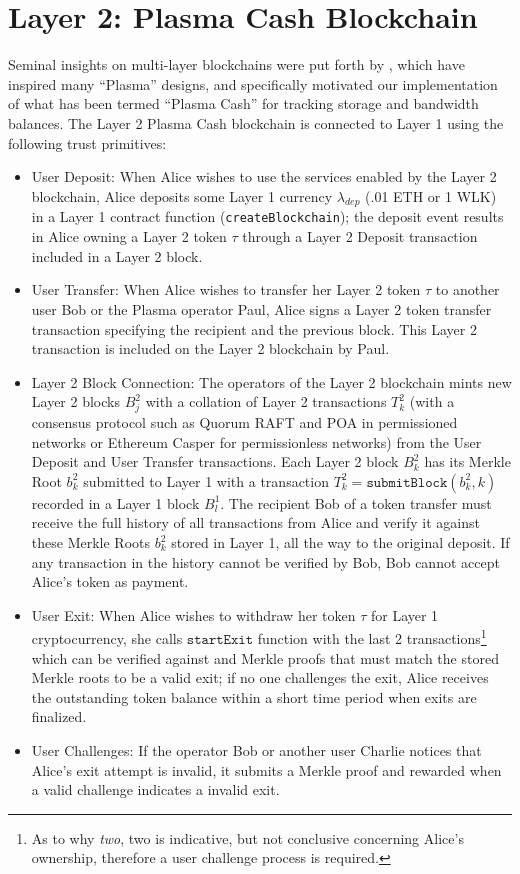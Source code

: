 \documentclass{article}
\newcommand{\block}[2]{B^{#1}_{#2}}
\newcommand{\blockhash}[2]{b^{#1}_{#2}}
\newcommand{\transaction}[2]{T_{#2}^#1}
\newcommand{\submitblock}[2]{\texttt{submitBlock}(#2, #1)}
\newcommand{\startexit}{\texttt{startExit}}
\begin{document}
\section{Layer 2: Plasma Cash Blockchain}

Seminal insights on multi-layer blockchains were put forth by \cite{poonbuterin2017}, which have inspired many ``Plasma'' designs, and specifically motivated our implementation of what has been termed ``Plasma Cash'' for tracking storage and  bandwidth balances.  The Layer 2 Plasma Cash blockchain is connected to Layer 1 using the following trust primitives:
\begin{itemize}
\item User Deposit: When Alice wishes to use the services enabled by the Layer 2 blockchain, Alice deposits some Layer 1 currency $\lambda_{dep}$ (.01 ETH or 1 WLK) in a Layer 1 contract function (\texttt{createBlockchain}); the deposit event results in Alice owning a Layer 2 token $\tau$ through a Layer 2 Deposit transaction included in a Layer 2 block.

\item User Transfer: When Alice wishes to transfer her Layer 2 token $\tau$ to another user Bob or the Plasma operator Paul, Alice signs a Layer 2 token transfer transaction specifying the recipient and the previous block.  This Layer 2 transaction is included on the Layer 2 blockchain by Paul.   

\item Layer 2 Block Connection: The operators of the Layer 2 blockchain mints new Layer 2 blocks $\block{2}{j}$ with a collation of Layer 2 transactions $\transaction{2}{k}$ (with a consensus protocol such as Quorum RAFT and POA in permissioned networks or Ethereum Casper for permissionless networks) from the User Deposit and User Transfer transactions.  Each Layer 2 block $\block{2}{k}$ has its Merkle Root $\blockhash{2}{k}$ submitted to Layer 1 with a transaction $\transaction{2}{k} = \submitblock{k}{\blockhash{2}{k}}$ recorded in a Layer 1 block $\block{1}{l}$.   The recipient Bob of a token transfer must receive the full history of all transactions from Alice and verify it against these Merkle Roots $\blockhash{2}{k}$ stored in Layer 1, all the way to the original deposit.  If any transaction in the history cannot be verified by Bob, Bob cannot accept Alice's token as payment.  

\item User Exit: When Alice wishes to withdraw her token $\tau$ for Layer 1 cryptocurrency, she calls $\startexit$ function with the last 2 transactions\footnote{As to why {\em two}, two is indicative, but not conclusive concerning Alice's ownership, therefore a user challenge process is required.} which can be verified against and Merkle proofs that must match the stored Merkle roots to be a valid exit; if no one challenges the exit, Alice receives the outstanding token balance within a short time period when exits are finalized.  

\item User Challenges:  If the operator Bob or another user Charlie notices that Alice's exit attempt is invalid, it submits a Merkle proof and rewarded when a valid challenge indicates a invalid exit.
\end{itemize}
\end{document}
